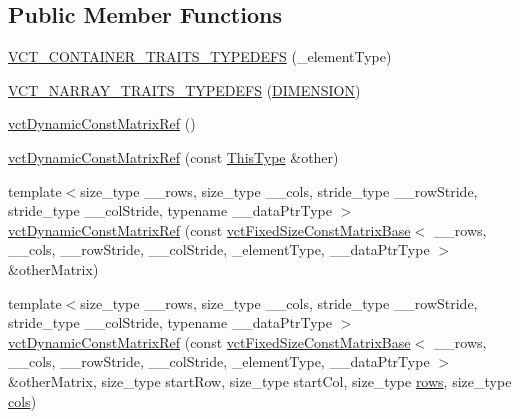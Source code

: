 \subsection*{Public Member Functions}
\begin{DoxyCompactItemize}
\item 
\hyperlink{classvct_dynamic_const_matrix_ref_a2cf267b4152c64b728cf4add6a1e3e88}{V\-C\-T\-\_\-\-C\-O\-N\-T\-A\-I\-N\-E\-R\-\_\-\-T\-R\-A\-I\-T\-S\-\_\-\-T\-Y\-P\-E\-D\-E\-F\-S} (\-\_\-element\-Type)
\item 
\hyperlink{classvct_dynamic_const_matrix_ref_a8a1b8f5b6c5c7de8b4add903a601a16b}{V\-C\-T\-\_\-\-N\-A\-R\-R\-A\-Y\-\_\-\-T\-R\-A\-I\-T\-S\-\_\-\-T\-Y\-P\-E\-D\-E\-F\-S} (\hyperlink{classvct_dynamic_const_matrix_ref_a79a3214fbb027346f5ba60336c95c1faa078cb772f47aba74a3233d177914f8fa}{D\-I\-M\-E\-N\-S\-I\-O\-N})
\item 
\hyperlink{classvct_dynamic_const_matrix_ref_a5ed569402fe79f4f8cc19ac4ee064c0d}{vct\-Dynamic\-Const\-Matrix\-Ref} ()
\item 
\hyperlink{classvct_dynamic_const_matrix_ref_aa360bbb215d63a6609d3371a2451e765}{vct\-Dynamic\-Const\-Matrix\-Ref} (const \hyperlink{classvct_dynamic_const_matrix_ref_a9c784be5ec51408ff2830ef67f2c01c8}{This\-Type} \&other)
\item 
{\footnotesize template$<$size\-\_\-type \-\_\-\-\_\-rows, size\-\_\-type \-\_\-\-\_\-cols, stride\-\_\-type \-\_\-\-\_\-row\-Stride, stride\-\_\-type \-\_\-\-\_\-col\-Stride, typename \-\_\-\-\_\-data\-Ptr\-Type $>$ }\\\hyperlink{classvct_dynamic_const_matrix_ref_a66e2cc287f240bd43a5c78e2f536e746}{vct\-Dynamic\-Const\-Matrix\-Ref} (const \hyperlink{classvct_fixed_size_const_matrix_base}{vct\-Fixed\-Size\-Const\-Matrix\-Base}$<$ \-\_\-\-\_\-rows, \-\_\-\-\_\-cols, \-\_\-\-\_\-row\-Stride, \-\_\-\-\_\-col\-Stride, \-\_\-element\-Type, \-\_\-\-\_\-data\-Ptr\-Type $>$ \&other\-Matrix)
\item 
{\footnotesize template$<$size\-\_\-type \-\_\-\-\_\-rows, size\-\_\-type \-\_\-\-\_\-cols, stride\-\_\-type \-\_\-\-\_\-row\-Stride, stride\-\_\-type \-\_\-\-\_\-col\-Stride, typename \-\_\-\-\_\-data\-Ptr\-Type $>$ }\\\hyperlink{classvct_dynamic_const_matrix_ref_a7ae23de2133b3d027e92606d4347e67f}{vct\-Dynamic\-Const\-Matrix\-Ref} (const \hyperlink{classvct_fixed_size_const_matrix_base}{vct\-Fixed\-Size\-Const\-Matrix\-Base}$<$ \-\_\-\-\_\-rows, \-\_\-\-\_\-cols, \-\_\-\-\_\-row\-Stride, \-\_\-\-\_\-col\-Stride, \-\_\-element\-Type, \-\_\-\-\_\-data\-Ptr\-Type $>$ \&other\-Matrix, size\-\_\-type start\-Row, size\-\_\-type start\-Col, size\-\_\-type \hyperlink{classvct_dynamic_const_matrix_base_a5eac13be2207ebeb8766cde379d73438}{rows}, size\-\_\-type \hyperlink{classvct_dynamic_const_matrix_base_aa6c51d41a100da49a7e7ac7edb20ecd9}{cols})

\end{DoxyCompactItemize}
